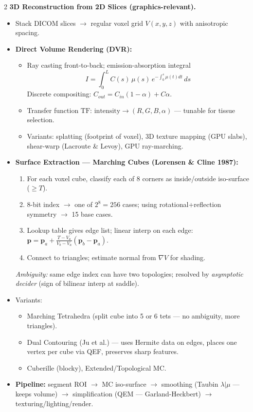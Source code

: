 \begin{paracol}{2}
\textbf{3D Reconstruction from 2D Slices (graphics-relevant).}
\begin{itemize}[leftmargin=*,nosep]
  \item Stack DICOM slices $\to$ regular voxel grid $V(x,y,z)$ with anisotropic spacing.
  \item \textbf{Direct Volume Rendering (DVR):}
    \begin{itemize}[leftmargin=*,nosep]
      \item Ray casting front-to-back; emission-absorption integral
      $$I=\int_0^L C(s)\,\mu(s)\,e^{-\int_0^s\mu(t)dt}\,ds$$
      Discrete compositing: $C_{out}=C_{in}(1-\alpha)+C\alpha$.
      \item Transfer function $\mathrm{TF}:\,\mathrm{intensity}\to(R,G,B,\alpha)$ — tunable for tissue selection.
      \item Variants: splatting (footprint of voxel), 3D texture mapping (GPU slabs), shear-warp (Lacroute \& Levoy), GPU ray-marching.
    \end{itemize}
  \item \textbf{Surface Extraction — Marching Cubes (Lorensen \& Cline 1987):}
    \begin{enumerate}[leftmargin=*,nosep]
      \item For each voxel cube, classify each of 8 corners as inside/outside iso-surface ($\geq T$).
      \item 8-bit index $\to$ one of $2^8=256$ cases; using rotational+reflection symmetry $\to$ 15 base cases.
      \item Lookup table gives edge list; linear interp on each edge:
      $\mathbf p=\mathbf p_a+\frac{T-V_a}{V_b-V_a}(\mathbf p_b-\mathbf p_a)$.
      \item Connect to triangles; estimate normal from $\nabla V$ for shading.
    \end{enumerate}
    \emph{Ambiguity:} same edge index can have two topologies; resolved by \emph{asymptotic decider} (sign of bilinear interp at saddle).
  \item Variants:
    \begin{itemize}[leftmargin=*,nosep]
      \item Marching Tetrahedra (split cube into 5 or 6 tets — no ambiguity, more triangles).
      \item Dual Contouring (Ju et al.) — uses Hermite data on edges, places one vertex per cube via QEF, preserves sharp features.
      \item Cuberille (blocky), Extended/Topological MC.
    \end{itemize}
  \item \textbf{Pipeline:} segment ROI $\to$ MC iso-surface $\to$ smoothing (Taubin $\lambda|\mu$ — keeps volume) $\to$ simplification (QEM — Garland-Heckbert) $\to$ texturing/lighting/render.
\end{itemize}


\end{paracol}
